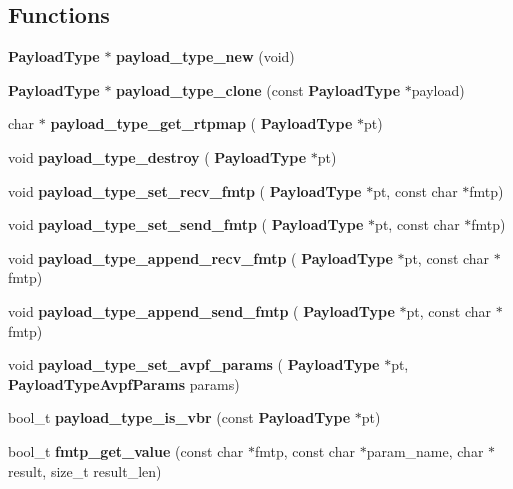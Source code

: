 \subsection*{Functions}
\begin{DoxyCompactItemize}
\item 
\mbox{\label{payloadtype_8h_a99fbc2b8049f5d960e075ee3712fcafc}} 
\textbf{ Payload\+Type} $\ast$ {\bfseries payload\+\_\+type\+\_\+new} (void)
\item 
\mbox{\label{payloadtype_8h_a8eb37c8c24a9cef81ebcfd7de159f1b9}} 
\textbf{ Payload\+Type} $\ast$ {\bfseries payload\+\_\+type\+\_\+clone} (const \textbf{ Payload\+Type} $\ast$payload)
\item 
\mbox{\label{payloadtype_8h_a3bf5a3d39e5d81862a74c8019e73821b}} 
char $\ast$ {\bfseries payload\+\_\+type\+\_\+get\+\_\+rtpmap} (\textbf{ Payload\+Type} $\ast$pt)
\item 
void \textbf{ payload\+\_\+type\+\_\+destroy} (\textbf{ Payload\+Type} $\ast$pt)
\item 
void \textbf{ payload\+\_\+type\+\_\+set\+\_\+recv\+\_\+fmtp} (\textbf{ Payload\+Type} $\ast$pt, const char $\ast$fmtp)
\item 
void \textbf{ payload\+\_\+type\+\_\+set\+\_\+send\+\_\+fmtp} (\textbf{ Payload\+Type} $\ast$pt, const char $\ast$fmtp)
\item 
\mbox{\label{payloadtype_8h_a9feae0faaabd9142baf9f3c4aaf92391}} 
void {\bfseries payload\+\_\+type\+\_\+append\+\_\+recv\+\_\+fmtp} (\textbf{ Payload\+Type} $\ast$pt, const char $\ast$fmtp)
\item 
\mbox{\label{payloadtype_8h_a53a46eabf38446f3ae7c36de352411f4}} 
void {\bfseries payload\+\_\+type\+\_\+append\+\_\+send\+\_\+fmtp} (\textbf{ Payload\+Type} $\ast$pt, const char $\ast$fmtp)
\item 
\mbox{\label{payloadtype_8h_a5d773587617555a45604da97d05a315e}} 
void {\bfseries payload\+\_\+type\+\_\+set\+\_\+avpf\+\_\+params} (\textbf{ Payload\+Type} $\ast$pt, \textbf{ Payload\+Type\+Avpf\+Params} params)
\item 
\mbox{\label{payloadtype_8h_a55b49d19b8af05f99b4e0a3107077553}} 
bool\+\_\+t {\bfseries payload\+\_\+type\+\_\+is\+\_\+vbr} (const \textbf{ Payload\+Type} $\ast$pt)
\item 
bool\+\_\+t \textbf{ fmtp\+\_\+get\+\_\+value} (const char $\ast$fmtp, const char $\ast$param\+\_\+name, char $\ast$result, size\+\_\+t result\+\_\+len)
\end{DoxyCompactItemize}
